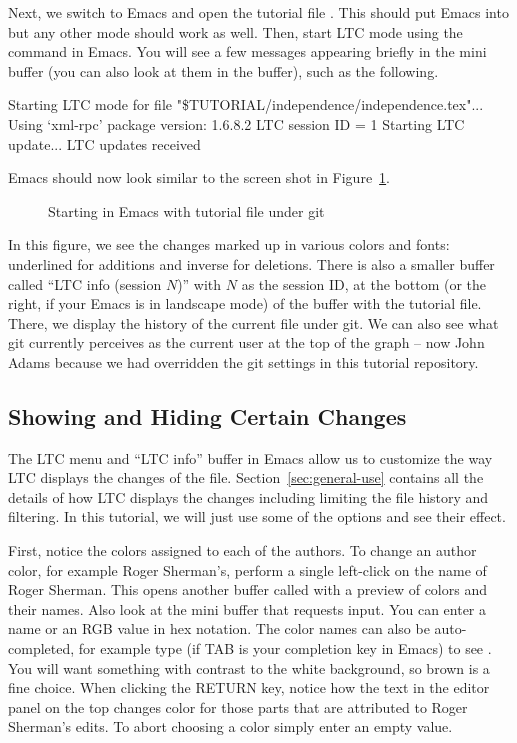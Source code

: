Next, we switch to Emacs and open the tutorial file .  This should put Emacs into  but any other mode should work as well.  Then, start LTC mode using the command  in Emacs.  You will see a few messages appearing briefly in the mini buffer (you can also look at them in the  buffer), such as the following.
\begin{FileVerbatim}
Starting LTC mode for file "\$TUTORIAL/independence/independence.tex"...
Using `xml-rpc' package version: 1.6.8.2
LTC session ID = 1
Starting LTC update...
LTC updates received
\end{FileVerbatim}
Emacs should now look similar to the screen shot in Figure~\ref{fig:emacs-open}.
\begin{figure}[t]
\centering
{}
\caption{Starting  in Emacs with tutorial file under git} \label{fig:emacs-open}
\end{figure}
In this figure, we see the changes marked up in various colors and fonts: underlined for additions and inverse for deletions.  There is also a smaller buffer called ``LTC info (session $N$)'' with $N$ as the session ID, at the bottom (or the right, if your Emacs is in landscape mode) of the buffer with the tutorial file.  There, we display the history of the current file under git.  We can also see what git currently perceives as the current user at the top of the graph -- now John Adams because we had overridden the git settings in this tutorial repository.

\subsection{Showing and Hiding Certain Changes}

The LTC menu and ``LTC info'' buffer in Emacs allow us to customize the way LTC displays the changes of the file.  Section~\ref{sec:general-use} contains all the details of how LTC displays the changes including limiting the file history and filtering.  In this tutorial, we will just use some of the options and see their effect.

First, notice the colors assigned to each of the authors.  To change an author color, for example Roger Sherman's,  perform a single left-click on the name of Roger Sherman.  This opens another buffer called  with a preview of colors and their names.  Also look at the mini buffer that requests input.   You can enter a name or an RGB value in hex notation.  The color names can also be auto-completed, for example type  (if TAB is your completion key in Emacs) to see .  You will want something with contrast to the white background, so brown is a fine choice.  When clicking the RETURN key, notice how the text in the editor panel on the top changes color for those parts that are attributed to Roger Sherman's edits.  To abort choosing a color simply enter an empty value.

